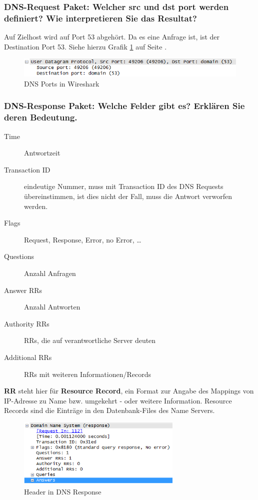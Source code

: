 \documentclass[a4paper,11pt]{scrartcl}
\begin{document}
\subsubsection{DNS-Request Paket: Welcher src und dst port werden definiert? Wie interpretieren Sie das Resultat?}
Auf Zielhost wird auf Port 53 abgehört. Da es eine Anfrage ist, ist der Destination Port 53. Siehe hierzu Grafik \ref{fig:dns_2_2_2} auf Seite \pageref{fig:dns_2_2_2}.
\begin{figure}[h]
	\centering
	\includegraphics[width=1.0\textwidth]{../aufg2/dns_2_2_2.png}
	\caption{DNS Ports in Wireshark}
	\label{fig:dns_2_2_2}
\end{figure}

\FloatBarrier
\subsubsection{DNS-Response Paket: Welche Felder gibt es? Erklären Sie deren Bedeutung.}
\begin{description}
	\item[Time] Antwortzeit
	\item[Transaction ID] eindeutige Nummer, muss mit Transaction ID des DNS Requests übereinstimmen, ist dies nicht der Fall, muss die Antwort verworfen werden.
	\item[Flags] Request, Response, Error, no Error, \ldots
	\item[Questions] Anzahl Anfragen
	\item[Answer RRs] Anzahl Antworten
	\item[Authority RRs] RRs, die auf verantwortliche Server deuten
	\item[Additional RRs] RRs mit weiteren Informationen/Records
\end{description}
\textbf{RR} steht hier für \textbf{Resource Record}, ein Format zur Angabe des Mappings von IP-Adresse zu Name bzw. umgekehrt - oder weitere Information. Resource Records sind die Einträge in den Datenbank-Files des Name Servers.
\begin{figure}[h]
	\centering
	\includegraphics[width=0.7\textwidth]{../aufg2/dns_2_2_3.png}
	\caption{Header in DNS Response}
	\label{fig:dns_2_2_3}
\end{figure}
\end{document}
